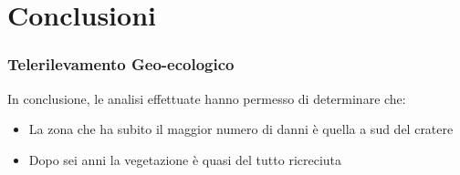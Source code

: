 \documentclass[10pt,aspectratio=169]{beamer}
\begin{document}
\section{Conclusioni}

\begin{frame}
\frametitle{Telerilevamento Geo-ecologico}
In conclusione, le analisi effettuate hanno permesso di determinare che:
\begin{itemize}
    \item La zona che ha subito il maggior numero di danni è quella a sud del cratere 
    \item Dopo sei anni la vegetazione è quasi del tutto ricreciuta 
\end{itemize}

\end{frame}






\end{document}
